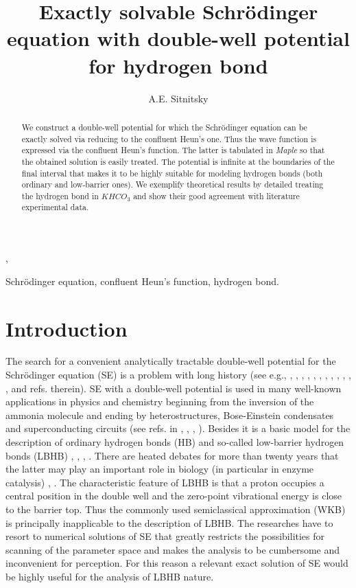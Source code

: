 \documentclass[singlespacing]{elsart}
\begin{document}
\begin{frontmatter}

\title{Exactly solvable Schr\"odinger equation with double-well potential for hydrogen bond}

\author{A.E. Sitnitsky},

\address{Kazan Institute of Biochemistry and Biophysics, P.O.B. 30, Kazan
420111, Russia. Tel. 8-843-231-90-37. e-mail: sitnitsky@kibb.knc.ru }

\begin{abstract}
We construct a double-well potential for which the Schr\"odinger equation can be exactly solved via reducing to  the confluent Heun's one. Thus the wave function is expressed via the confluent Heun's function. The latter is tabulated in {\sl {Maple}} so that the obtained solution is easily treated. The potential is infinite at the boundaries of the final interval that makes it to be highly suitable for modeling hydrogen bonds (both ordinary and low-barrier ones). We exemplify theoretical results by detailed treating the hydrogen bond in  $KHCO_3$ and show their good agreement with literature experimental data.
\end{abstract}

\begin{keyword}
Schr\"odinger equation, confluent Heun's function, hydrogen bond.
\end{keyword}
\end{frontmatter}

\section{Introduction}
The search for a convenient analytically tractable double-well potential for the Schr\"odinger equation (SE) is a problem with long history (see e.g., \cite{Ros32}, \cite{Man35}, \cite{Raz80}, \cite{Kon86}, \cite{Kon95}, \cite{Xie12}, \cite{Dow13}, \cite{Che13}, \cite{Har14}, \cite{Tur10}, \cite{Tur16}, \cite{Dow16}, \cite{Dow17} and refs. therein). SE with a double-well potential is used in many well-known applications in physics and chemistry beginning from the inversion of the ammonia molecule and ending by heterostructures, Bose-Einstein condensates and superconducting circuits (see refs. in \cite{Xie12}, \cite{Dow13}, \cite{Che13}, \cite{Har14}). Besides it is a basic model for the description of ordinary hydrogen bonds (HB) and so-called low-barrier hydrogen bonds (LBHB) \cite{Mes02}, \cite{Mes03}, \cite{Mol06}, \cite{Mol07}. There are heated debates for more than twenty years that the latter may play an important role in biology (in particular in enzyme catalysis) \cite{Cle98}, \cite{Sho04}. The characteristic feature of LBHB is that a proton occupies a central position in the double well and the zero-point vibrational energy is close to the barrier top. Thus the commonly used semiclassical approximation (WKB) is principally inapplicable to the description of LBHB. The researches have to resort to numerical solutions of SE that greatly restricts the possibilities for scanning of the parameter space and makes the analysis to be cumbersome and inconvenient for perception. For this reason a relevant exact solution of SE would be highly useful for the analysis of LBHB nature.
\end{document}
